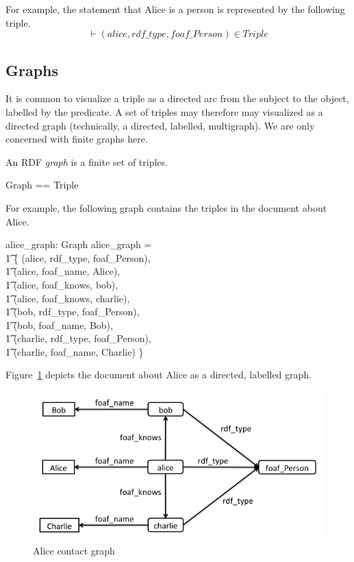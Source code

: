 \documentclass{article}
\begin{document}
For example, the statement that Alice is a person is represented by the following triple.
\[\vdash 
	(alice, rdf\_type, foaf\_Person) \in Triple
\]

\subsection{Graphs}

It is common to visualize a triple as a directed arc from the subject to the object, labelled by the predicate.
A set of triples may therefore may visualized as a directed graph (technically, a directed, labelled, multigraph).
We are only concerned with finite graphs here.

An RDF {\em graph} is a finite set of triples.
\begin{zed}
Graph == \finset Triple
\end{zed}

For example, the following graph contains the triples in the document about Alice.
\begin{axdef}
	alice\_graph: Graph
\where
	alice\_graph = \\
\t1		\{ (alice, rdf\_type, foaf\_Person), \\
\t1		(alice, foaf\_name, Alice), \\
\t1		(alice, foaf\_knows, bob), \\
\t1		(alice, foaf\_knows, charlie), \\
\t1		(bob, rdf\_type, foaf\_Person), \\
\t1		(bob, foaf\_name, Bob), \\
\t1		(charlie, rdf\_type, foaf\_Person), \\
\t1		(charlie, foaf\_name, Charlie) \}
\end{axdef}

Figure~\ref{fig:alice-contact} depicts the document about Alice as a directed, labelled graph.

\begin{figure}[h]
\centering
\includegraphics[scale=0.5]{alice-contact}
\caption{Alice contact graph}
\label{fig:alice-contact}
\end{figure}
\end{document}
